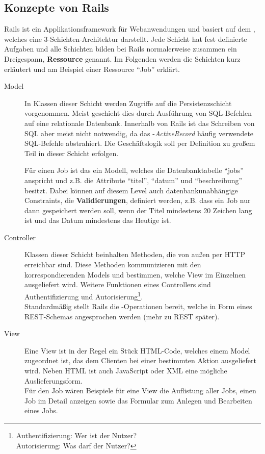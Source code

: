 \subsection{Konzepte von Rails}
\label{sec:railsconcepts}
Rails ist ein Applikationsframework für Webanwendungen und basiert auf dem  , welches eine 3-Schichten-Architektur darstellt. Jede Schicht hat fest definierte Aufgaben und alle Schichten bilden bei Rails normalerweise zusammen ein Dreigespann, \textbf{Ressource} genannt. Im Folgenden werden die Schichten kurz erläutert und am Beispiel einer Ressource "`Job"' erklärt.
\begin{description}
 \item[Model] In Klassen dieser Schicht werden Zugriffe auf die Persistenzschicht vorgenommen. Meist geschieht dies durch Ausführung von SQL-Befehlen auf eine relationale Datenbank. Innerhalb von Rails ist das Schreiben von SQL aber meist nicht notwendig, da das -\textit{ActiveRecord} häufig verwendete SQL-Befehle abstrahiert. Die Geschäftslogik soll per Definition zu großem Teil in dieser Schicht erfolgen.

 Für einen Job ist das ein Modell, welches die Datenbanktabelle "`jobs"' anspricht und z.B. die Attribute "`titel"', "`datum"' und "`beschreibung"' besitzt. Dabei können auf diesem Level auch datenbankunabhängige Constraints, die \textbf{Validierungen}, definiert werden, z.B. dass ein Job nur dann gespeichert werden soll, wenn der Titel mindestens 20 Zeichen lang ist und das Datum mindestens das Heutige ist.
 \item[Controller] Klassen dieser Schicht beinhalten Methoden, die von außen per HTTP erreichbar sind. Diese Methoden kommunizieren mit den korrespondierenden Models und bestimmen, welche View im Einzelnen ausgeliefert wird. Weitere Funktionen eines Controllers sind Authentifizierung und Autorisierung\footnote{Authentifizierung: Wer ist der Nutzer?\\Autorisierung: Was darf der Nutzer?}.\\
 Standardmäßig stellt Rails die -Operationen bereit, welche in Form eines REST-Schemas angesprochen werden (mehr zu REST später).
 \item[View] Eine View ist in der Regel ein Stück HTML-Code, welches einem Model zugeordnet ist, das dem Clienten bei einer bestimmten Aktion ausgeliefert wird. Neben HTML ist auch JavaScript oder XML eine mögliche Auslieferungsform.\\
 Für den Job wären Beispiele für eine View die Auflistung aller Jobs, einen Job im Detail anzeigen sowie das Formular zum Anlegen und Bearbeiten eines Jobs.
\end{description}
